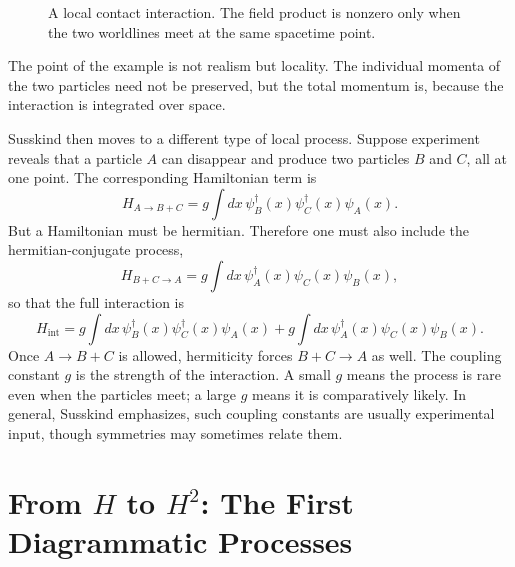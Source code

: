 \begin{figure}
\centering
{}
\caption{A local contact interaction. The field product is nonzero only when the two worldlines meet at the same spacetime point.}
\end{figure}

The point of the example is not realism but locality. The individual momenta of the two particles need not be preserved, but the total momentum is, because the interaction is integrated over space.

Susskind then moves to a different type of local process. Suppose experiment reveals that a particle \(A\) can disappear and produce two particles \(B\) and \(C\), all at one point. The corresponding Hamiltonian term is
\begin{equation}
H_{A\to B+C}
=
g\int dx\,\psi_B^\dagger(x)\psi_C^\dagger(x)\psi_A(x).
\end{equation}
But a Hamiltonian must be hermitian. Therefore one must also include the hermitian-conjugate process,
\begin{equation}
H_{B+C\to A}
=
g\int dx\,\psi_A^\dagger(x)\psi_C(x)\psi_B(x),
\end{equation}
so that the full interaction is
\begin{equation}
H_{\mathrm{int}}
=
g\int dx\,\psi_B^\dagger(x)\psi_C^\dagger(x)\psi_A(x)
+
g\int dx\,\psi_A^\dagger(x)\psi_C(x)\psi_B(x).
\end{equation}
Once \(A\to B+C\) is allowed, hermiticity forces \(B+C\to A\) as well. The coupling constant \(g\) is the strength of the interaction. A small \(g\) means the process is rare even when the particles meet; a large \(g\) means it is comparatively likely. In general, Susskind emphasizes, such coupling constants are usually experimental input, though symmetries may sometimes relate them.

\section{From \(H\) to \(H^2\): The First Diagrammatic Processes}


